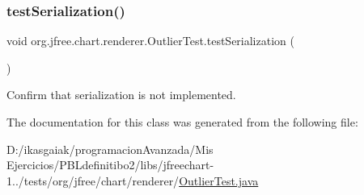 \subsubsection{\texorpdfstring{test\+Serialization()}{testSerialization()}}
{\footnotesize\ttfamily void org.\+jfree.\+chart.\+renderer.\+Outlier\+Test.\+test\+Serialization (\begin{DoxyParamCaption}{ }\end{DoxyParamCaption})}

Confirm that serialization is not implemented. 

The documentation for this class was generated from the following file\+:\begin{DoxyCompactItemize}
\item 
D\+:/ikasgaiak/programacion\+Avanzada/\+Mis Ejercicios/\+P\+B\+Ldefinitibo2/libs/jfreechart-\/1../tests/org/jfree/chart/renderer/\mbox{\hyperlink{_outlier_test_8java}{Outlier\+Test.\+java}}\end{DoxyCompactItemize}
